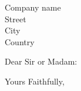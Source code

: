 \documentclass{lettear}
\def\myopening{Dear Sir or Madam}
\begin{document}
\begin{letter}{Company name \\ Street\\ City\\ Country}
\opening{\myopening\emdash:}
\phantom{\myopening\emdash:}%
    
\closing{Yours Faithfully,}
\end{letter}
\end{document}
